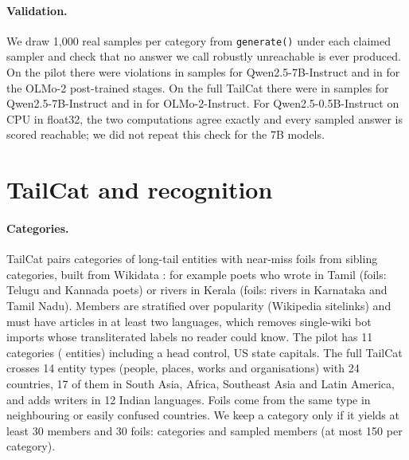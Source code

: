\documentclass[11pt]{article}
\begin{document}
\paragraph{Validation.} We draw 1{,}000 real samples per category from \texttt{generate()} under each claimed sampler and check that no answer we call robustly unreachable is ever produced. On the pilot there were \gzViolations{} violations in \gzSamples{} samples for Qwen2.5-7B-Instruct and \goViolations{} in \goSamples{} for the OLMo-2 post-trained stages. On the full TailCat there were \ptViolationsQwenInst{} in \ptSamplesQwenInst{} samples for Qwen2.5-7B-Instruct and \ptViolationsOlmoInst{} in \ptSamplesOlmoInst{} for OLMo-2-Instruct. For Qwen2.5-0.5B-Instruct on CPU in float32, the two computations agree exactly and every sampled answer is scored reachable; we did not repeat this check for the 7B models.

\section{TailCat and recognition}\label{sec:data}

\paragraph{Categories.} TailCat pairs categories of long-tail entities with near-miss foils from sibling categories, built from Wikidata \citep{vrandecic2014wikidata}: for example poets who wrote in Tamil (foils: Telugu and Kannada poets) or rivers in Kerala (foils: rivers in Karnataka and Tamil Nadu). Members are stratified over popularity (Wikipedia sitelinks) and must have articles in at least two languages, which removes single-wiki bot imports whose transliterated labels no reader could know. The pilot has 11 categories (\gzEntities{} entities) including a head control, US state capitals. The full TailCat crosses 14 entity types (people, places, works and organisations) with 24 countries, 17 of them in South Asia, Africa, Southeast Asia and Latin America, and adds writers in 12 Indian languages. Foils come from the same type in neighbouring or easily confused countries. We keep a category only if it yields at least 30 members and 30 foils: \ptCategories{} categories and \ptMembers{} sampled members (at most 150 per category).
\end{document}
